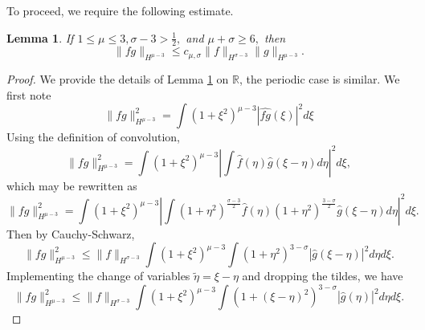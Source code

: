 \documentclass[reqno]{amsart}
\theoremstyle{plain}
\newtheorem{lemma}{Lemma}[section]
\numberwithin{equation}{section}
\begin{document}
To proceed, we require the following   estimate. 
\begin{lemma}\label{lemma3}
If $1 \leq \mu \leq 3, \sigma - 3 > \frac12,$ and $\mu + \sigma \geq 6,$ then 
    \[\|fg\|_{H^{\mu-3}} \leq c_{\mu,\sigma} \|f\|_{H^{\sigma-3}} \|g\|_{H^{\mu-3}}.\]
\end{lemma}
\begin{proof}
    We provide the details of Lemma \ref{lemma3} on $\mathbb{R}$, the periodic case is similar. 
We first note 
\begin{equation}
    \| fg \|_{H^{\mu - 3}}^2 = \int(1 + \xi^2)^{\mu-3} \left|\widehat{fg}(\xi)\right|^2 d\xi 
\end{equation}
Using the definition of convolution,
\begin{equation*}
    \| fg \|_{H^{\mu - 3}}^2 = \int(1 + \xi^2)^{\mu-3} \left|\int \hat{f}(\eta) \hat{g}(\xi - \eta)d\eta\right|^2 d\xi, 
\end{equation*}
which may be rewritten as 
\begin{equation}
    \| fg \|_{H^{\mu - 3}}^2 = 
        \int(1 + \xi^2)^{\mu-3} \left|\int (1+\eta^2)^{\frac{\sigma-3}{2}}\hat{f}(\eta)(1+\eta^2)^{\frac{3-\sigma}{2}}\hat{g}(\xi - \eta)d\eta\right|^2 d\xi. 
\end{equation}
Then by Cauchy-Schwarz, 
\begin{equation}
    \| fg \|_{H^{\mu - 3}}^2 \leq 
        \|f\|_{H^{\sigma - 3}} \int(1 + \xi^2)^{\mu-3}\int(1+\eta^2)^{3-\sigma}\left| \hat{g}(\xi - \eta)\right|^2 d\eta d\xi. 
\end{equation}
Implementing the change of variables $\tilde{\eta} = \xi - \eta$ and dropping the tildes, we have 
\begin{equation}
    \| fg \|_{H^{\mu - 3}}^2 \leq 
        \|f\|_{H^{\sigma - 3}} \int(1 + \xi^2)^{\mu-3}\int(1+(\xi - \eta)^2)^{3-\sigma}\left| \hat{g}(\eta)\right|^2 d\eta d\xi. 
\end{equation}

\end{proof}
\end{document}
